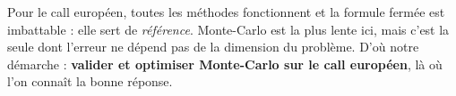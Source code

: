 \begin{retenir}
Pour le call européen, toutes les méthodes fonctionnent et la formule fermée est imbattable : elle sert de \emph{référence}. Monte-Carlo est la plus lente ici, mais c'est la seule dont l'erreur ne dépend pas de la dimension du problème. D'où notre démarche : \textbf{valider et optimiser Monte-Carlo sur le call européen}, là où l'on connaît la bonne réponse.
\end{retenir}
